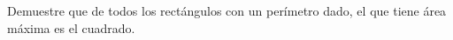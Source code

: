 \item Demuestre que de todos los rectángulos con un perímetro dado, el que tiene área máxima es el cuadrado.
